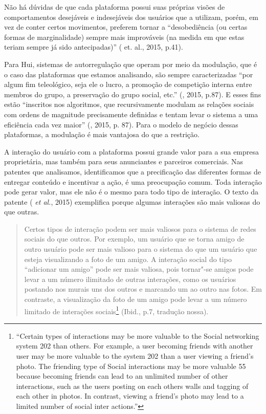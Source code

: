 Não há dúvidas de que cada plataforma possui suas próprias visões de
comportamentos desejáveis e indesejáveis dos usuários que a utilizam,
porém, em vez de conter certos movimentos, preferem tornar a
``desobediência (ou certas formas de marginalidade) sempre mais
improváveis (na medida em que estas teriam sempre já sido antecipadas)''
( et. al., 2015, p.41).

Para Hui, sistemas de autorregulação que operam por meio da modulação,
que é o caso das plataformas que estamos analisando, são sempre
caracterizadas ``por algum fim teleológico, seja ele o lucro, a promoção
de competição interna entre membros do grupo, a preservação do grupo
social, etc.'' (, 2015, p.87). E esses fins estão ``inscritos nos
algoritmos, que recursivamente modulam as relações sociais com ordens de
magnitude precisamente definidas e tentam levar o sistema a uma
eficiência cada vez maior'' (, 2015, p. 87). Para o modelo de negócio
dessas plataformas, a modulação é mais vantajosa do que a restrição.

A interação do usuário com a plataforma possui grande valor para a sua
empresa proprietária, mas também para seus anunciantes e parceiros
comerciais. Nas patentes que analisamos, identificamos que a
precificação das diferentes formas de entregar conteúdo e incentivar a
ação, é uma preocupação comum. Toda interação pode gerar valor, mas ele
não é o mesmo para todo tipo de interação. O texto da patente
 ( \emph{et al.}, 2015) exemplifica porque algumas
interações são mais valiosas do que outras.

\begin{quote}
Certos tipos de interação podem ser mais valiosos para o sistema de
redes sociais do que outros. Por exemplo, um usuário que se torna amigo
de outro usuário pode ser mais valioso para o sistema do que um usuário
que esteja visualizando a foto de um amigo. A interação social do tipo
``adicionar um amigo'' pode ser mais valiosa, pois tornar"-se amigos pode
levar a um número ilimitado de outras interações, como os usuários
postando nos murais uns dos outros e marcando um ao outro nas fotos. Em
contraste, a visualização da foto de um amigo pode levar a um número
limitado de interações sociais\footnote{``Certain types of interactions
  may be more valuable to the Social networking system 202 than others.
  For example, a user becoming friends with another user may be more
  valuable to the system 202 than a user viewing a friend's photo. The
  friending type of Social interactions may be more valuable 55 because
  becoming friends can lead to an unlimited number of other
  interactions, such as the users posting on each others walls and
  tagging of each other in photos. In contrast, viewing a friend's photo
  may lead to a limited number of social inter actions.''} (Ibid., p.7,
tradução nossa).
\end{quote}

